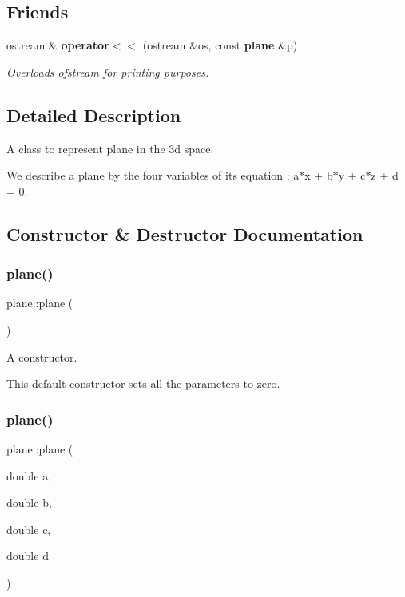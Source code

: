 \subsection*{Friends}
\begin{DoxyCompactItemize}
\item 
ostream \& \textbf{ operator$<$$<$} (ostream \&os, const \textbf{ plane} \&p)
\begin{DoxyCompactList}\small\item\em Overloads ofstream for printing purposes. \end{DoxyCompactList}\end{DoxyCompactItemize}


\subsection{Detailed Description}
A class to represent plane in the 3d space. 

We describe a plane by the four variables of its equation \+: a$\ast$x + b$\ast$y + c$\ast$z + d = 0. 

\subsection{Constructor \& Destructor Documentation}
\mbox{\label{classplane_ab36174f444a88d3a53d9892828308b48}} 
\subsubsection{plane()\hspace{0.1cm}{\footnotesize\ttfamily [1/3]}}
{\footnotesize\ttfamily plane\+::plane (\begin{DoxyParamCaption}{ }\end{DoxyParamCaption})}



A constructor. 

This default constructor sets all the parameters to zero. \mbox{\label{classplane_a3c279ae2dfff0222a61640427f6ce4d7}} 
\subsubsection{plane()\hspace{0.1cm}{\footnotesize\ttfamily [2/3]}}
{\footnotesize\ttfamily plane\+::plane (\begin{DoxyParamCaption}\item[{double}]{a,  }\item[{double}]{b,  }\item[{double}]{c,  }\item[{double}]{d }\end{DoxyParamCaption})}



